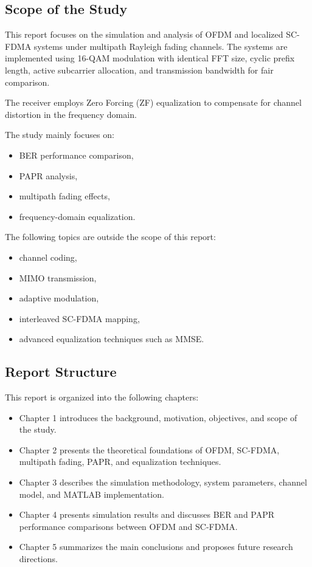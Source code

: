 \subsection{Scope of the Study}

This report focuses on the simulation and analysis of OFDM and localized
SC-FDMA systems under multipath Rayleigh fading channels. The systems are
implemented using 16-QAM modulation with identical FFT size, cyclic prefix
length, active subcarrier allocation, and transmission bandwidth for fair
comparison.

The receiver employs Zero Forcing (ZF) equalization to compensate for
channel distortion in the frequency domain.

The study mainly focuses on:
\begin{itemize}
    \item BER performance comparison,
    \item PAPR analysis,
    \item multipath fading effects,
    \item frequency-domain equalization.
\end{itemize}

The following topics are outside the scope of this report:
\begin{itemize}
    \item channel coding,
    \item MIMO transmission,
    \item adaptive modulation,
    \item interleaved SC-FDMA mapping,
    \item advanced equalization techniques such as MMSE.
\end{itemize}

\subsection{Report Structure}

This report is organized into the following chapters:

\begin{itemize}
    \item Chapter 1 introduces the background, motivation, objectives,
    and scope of the study.
    
    \item Chapter 2 presents the theoretical foundations of OFDM,
    SC-FDMA, multipath fading, PAPR, and equalization techniques.
    
    \item Chapter 3 describes the simulation methodology, system
    parameters, channel model, and MATLAB implementation.
    
    \item Chapter 4 presents simulation results and discusses BER and
    PAPR performance comparisons between OFDM and SC-FDMA.
    
    \item Chapter 5 summarizes the main conclusions and proposes future
    research directions.
\end{itemize}

\newpage
\clearpage
